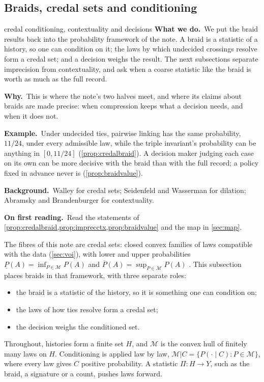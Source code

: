 \documentclass[11pt]{article}
\theoremstyle{definition}\newtheorem{definition}[theorem]{Definition}\newtheorem{remark}[theorem]{Remark}\newtheorem{example}[theorem]{Example}\newtheorem{problem}[theorem]{Open problem}\crefname{problem}{Problem}{Problems}
\newcommand{\rbwhat}{\textcolor{rbWhat}{\textbf{What we do.}}~}\newcommand{\rbwhy}{\par\smallskip\textcolor{rbWhy}{\textbf{Why.}}~}
\newcommand{\rbex}{\par\smallskip\textcolor{rbEx}{\textbf{Example.}}~}\newcommand{\rbbg}{\par\smallskip\textcolor{rbBg}{\textbf{Background.}}~}
\newcommand{\rbfirst}{\par\smallskip\textcolor{rbFirst}{\textbf{On first reading.}}~}
\begin{document}
\subsection{Braids, credal sets and conditioning}\label{sec:credalbraid}
\begin{readerbox}{credal conditioning, contextuality and decisions}
\rbwhat We put the braid results back into the probability framework of the note. A braid is a statistic of a history, so one can condition on it; the laws by which undecided crossings resolve form a credal set; and a decision weighs the result. The next subsections separate imprecision from contextuality, and ask when a coarse statistic like the braid is worth as much as the full record.
\rbwhy This is where the note's two halves meet, and where its claims about braids are made precise: when compression keeps what a decision needs, and when it does not.
\rbex Under undecided ties, pairwise linking has the same probability, $11/24$, under every admissible law, while the triple invariant's probability can be anything in $[0,11/24]$ (\cref{prop:credalbraid}). A decision maker judging each case on its own can be more decisive with the braid than with the full record; a policy fixed in advance never is (\cref{prop:braidvalue}).
\rbbg Walley \cite{Walley1991} for credal sets; Seidenfeld and Wasserman \cite{SeidenfeldWasserman1993} for dilation; Abramsky and Brandenburger \cite{AbramskyBrandenburger2011} for contextuality.
\rbfirst Read the statements of \cref{prop:credalbraid,prop:imprecctx,prop:braidvalue} and the map in \cref{sec:map}.
\end{readerbox}
The fibres of this note are credal sets: closed convex families of laws compatible with the data (\cref{sec:voi}), with lower and upper probabilities $\underline P(A)=\inf_{P\in\mathcal M}P(A)$ and $\overline P(A)=\sup_{P\in\mathcal M}P(A)$ \cite{Walley1991}. This subsection places braids in that framework, with three separate roles:
\begin{itemize}
\item the braid is a statistic of the history, so it is something one can condition on;
\item the laws of how ties resolve form a credal set;
\item the decision weighs the conditioned set.
\end{itemize}
Throughout, histories form a finite set $H$, and $\mathcal M$ is the convex hull of finitely many laws on $H$. Conditioning is applied law by law, $\mathcal M|C=\{P(\cdot\mid C):P\in\mathcal M\}$, where every law gives $C$ positive probability. A statistic $\Pi:H\to Y$, such as the braid, a signature or a count, pushes laws forward.
\end{document}
